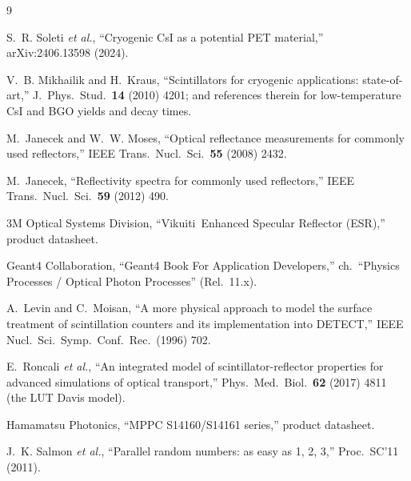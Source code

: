 \documentclass[11pt,a4paper]{article}
\begin{document}
\begin{thebibliography}{9}

S.~R. Soleti \emph{et al.},
``Cryogenic CsI as a potential PET material,''
arXiv:2406.13598 (2024).

V.~B. Mikhailik and H.~Kraus,
``Scintillators for cryogenic applications: state-of-art,''
J.~Phys.\ Stud.\ \textbf{14} (2010) 4201; and references therein for low-temperature
CsI and BGO yields and decay times.

M.~Janecek and W.~W. Moses,
``Optical reflectance measurements for commonly used reflectors,''
IEEE Trans.\ Nucl.\ Sci.\ \textbf{55} (2008) 2432.

M.~Janecek,
``Reflectivity spectra for commonly used reflectors,''
IEEE Trans.\ Nucl.\ Sci.\ \textbf{59} (2012) 490.

3M Optical Systems Division,
``Vikuiti\texttrademark\ Enhanced Specular Reflector (ESR),'' product datasheet.

Geant4 Collaboration,
``Geant4 Book For Application Developers,'' ch.\ ``Physics Processes / Optical Photon
Processes'' (Rel.\ 11.x).

A.~Levin and C.~Moisan,
``A more physical approach to model the surface treatment of scintillation counters and its
implementation into DETECT,''
IEEE Nucl.\ Sci.\ Symp.\ Conf.\ Rec.\ (1996) 702.

E.~Roncali \emph{et al.},
``An integrated model of scintillator-reflector properties for advanced simulations of
optical transport,''
Phys.\ Med.\ Biol.\ \textbf{62} (2017) 4811 (the LUT Davis model).

Hamamatsu Photonics,
``MPPC S14160/S14161 series,'' product datasheet.

J.~K. Salmon \emph{et al.},
``Parallel random numbers: as easy as 1, 2, 3,''
Proc.\ SC'11 (2011).

\end{thebibliography}
\end{document}
